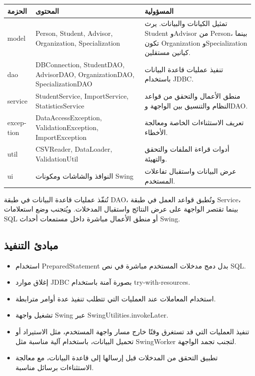 \documentclass[12pt,a4paper]{article}
\begin{document}
\begin{tabularx}{\textwidth}{|p{2.7cm}|Y|Y|}
\hline
\textbf{الحزمة} & \textbf{المحتوى} & \textbf{المسؤولية}\\ \hline
\textenglish{model} & \textenglish{Person, Student, Advisor, Organization, Specialization} & تمثيل الكيانات والبيانات. يرث \textenglish{Student} و\textenglish{Advisor} من \textenglish{Person}، بينما تكون \textenglish{Organization} و\textenglish{Specialization} كيانين مستقلين.\\ \hline
\textenglish{dao} & \textenglish{DBConnection, StudentDAO, AdvisorDAO, OrganizationDAO, SpecializationDAO} & تنفيذ عمليات قاعدة البيانات باستخدام JDBC.\\ \hline
\textenglish{service} & \textenglish{StudentService, ImportService, StatisticsService} & منطق الأعمال والتحقق من قواعد النظام والتنسيق بين الواجهة وDAO.\\ \hline
\textenglish{exception} & \textenglish{DataAccessException, ValidationException, ImportException} & تعريف الاستثناءات الخاصة ومعالجة الأخطاء.\\ \hline
\textenglish{util} & \textenglish{CSVReader, DataLoader, ValidationUtil} & أدوات قراءة الملفات والتحقق والتهيئة.\\ \hline
\textenglish{ui} & النوافذ والشاشات ومكونات Swing & عرض البيانات واستقبال تفاعلات المستخدم.\\ \hline
\end{tabularx}

تُنفّذ عمليات قاعدة البيانات في طبقة DAO، وتُطبق قواعد العمل في طبقة Service، بينما تقتصر الواجهة على عرض النتائج واستقبال المدخلات. ويُتجنب وضع استعلامات SQL أو منطق الأعمال مباشرة داخل مستمعات أحداث Swing.

\subsection{مبادئ التنفيذ}
\begin{itemize}
\item استخدام \textenglish{PreparedStatement} بدل دمج مدخلات المستخدم مباشرة في نص SQL.
\item إغلاق موارد JDBC بصورة آمنة باستخدام \textenglish{try-with-resources}.
\item استخدام المعاملات عند العمليات التي تتطلب تنفيذ عدة أوامر مترابطة.
\item تشغيل واجهة Swing عبر \textenglish{SwingUtilities.invokeLater}.
\item تنفيذ العمليات التي قد تستغرق وقتًا خارج مسار واجهة المستخدم، مثل الاستيراد أو تحميل البيانات، باستخدام آلية مناسبة مثل \textenglish{SwingWorker} لتجنب تجمد الواجهة.
\item تطبيق التحقق من المدخلات قبل إرسالها إلى قاعدة البيانات، مع معالجة الاستثناءات برسائل مناسبة.
\end{itemize}
\end{document}
